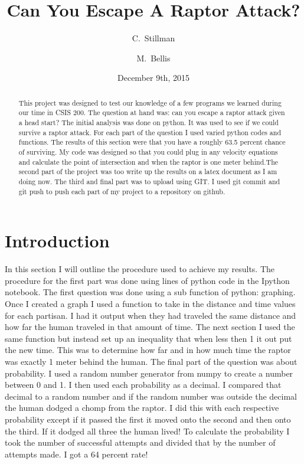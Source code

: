 \documentclass[twocolumn]{revtex4}
\begin{document}
\title{
Can You Escape A Raptor Attack?
}

\author{C.~Stillman}
\author{M.~Bellis}

\date{December 9th, 2015}

\begin{abstract}
	This project was designed to test our knowledge of a few programs we learned during our time in CSIS 200. The question at hand was: can you escape a raptor attack given a head start? The initial analysis was done on python. It was used to see if we could survive a raptor attack. For each part of the question I used varied python codes and functions. The results of this section were that you have a roughly 63.5 percent chance of surviving. My code was designed so that you could plug in any velocity equations and calculate the point of intersection and when the raptor is one meter behind.The second part of the project was too write up the results on a latex document as I am doing now. The third and final part was to upload using GIT. I used git commit and git push to push each part of my project to a repository on github. 
    	
\end{abstract}

\maketitle

\section{Introduction}
In this section I will outline the procedure used to achieve my results.
	The procedure for the first part was done using lines of python code in the Ipython notebook. The first question was done using a sub function of python: graphing. Once I created a graph I used a function to take in the distance and time values for each partisan. I had it output when they had traveled the same distance and how far the human traveled in that amount of time. The next section I used the same function but instead set up an inequality that when less then 1 it out put the new time. This was to determine how far and in how much time the raptor was exactly 1 meter behind the human. The final part of the question was about probability. I used a random number generator from numpy to create a number between 0 and 1. I then used each probability as a decimal. I compared that decimal to a random number and if the random number was outside the decimal the human dodged a chomp from the raptor. I did this with each respective probability except if it passed the first it moved onto the second and then onto the third. If it dodged all three the human lived! To calculate the probability I took the number of successful attempts and divided that by the number of attempts made. I got a 64 percent rate!
\end{document}
